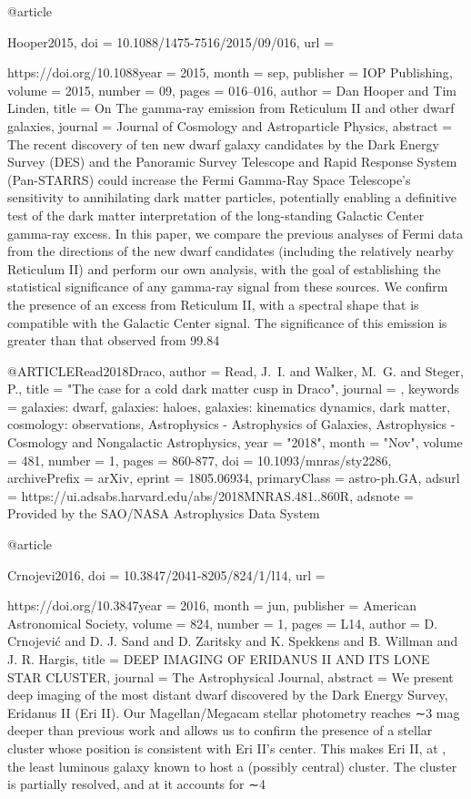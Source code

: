 \documentclass[apj]{emulateapj}
\begin{document}
{{{{@article{Hooper2015,
	doi = {10.1088/1475-7516/2015/09/016},
	url = {https://doi.org/10.1088year = 2015,
	month = {sep},
	publisher = {{IOP} Publishing},
	volume = {2015},
	number = {09},
	pages = {016--016},
	author = {Dan Hooper and Tim Linden},
	title = {On The gamma-ray emission from Reticulum {II} and other dwarf galaxies},
	journal = {Journal of Cosmology and Astroparticle Physics},
	abstract = {The recent discovery of ten new dwarf galaxy candidates by the Dark Energy Survey (DES) and the Panoramic Survey Telescope and Rapid Response System (Pan-STARRS) could increase the Fermi Gamma-Ray Space Telescope's sensitivity to annihilating dark matter particles, potentially enabling a definitive test of the dark matter interpretation of the long-standing Galactic Center gamma-ray excess. In this paper, we compare the previous analyses of Fermi data from the directions of the new dwarf candidates (including the relatively nearby Reticulum II) and perform our own analysis, with the goal of establishing the statistical significance of any gamma-ray signal from these sources. We confirm the presence of an excess from Reticulum II, with a spectral shape that is compatible with the Galactic Center signal. The significance of this emission is greater than that observed from 99.84}

@ARTICLE{Read2018Draco,
       author = {{Read}, J.~I. and {Walker}, M.~G. and {Steger}, P.},
        title = "{The case for a cold dark matter cusp in Draco}",
      journal = {\mnras},
     keywords = {galaxies: dwarf, galaxies: haloes, galaxies: kinematics dynamics, dark matter, cosmology: observations, Astrophysics - Astrophysics of Galaxies, Astrophysics - Cosmology and Nongalactic Astrophysics},
         year = "2018",
        month = "Nov",
       volume = {481},
       number = {1},
        pages = {860-877},
          doi = {10.1093/mnras/sty2286},
archivePrefix = {arXiv},
       eprint = {1805.06934},
 primaryClass = {astro-ph.GA},
       adsurl = {https://ui.adsabs.harvard.edu/abs/2018MNRAS.481..860R},
      adsnote = {Provided by the SAO/NASA Astrophysics Data System}
}



@article{Crnojevi2016,
	doi = {10.3847/2041-8205/824/1/l14},
	url = {https://doi.org/10.3847year = 2016,
	month = {jun},
	publisher = {American Astronomical Society},
	volume = {824},
	number = {1},
	pages = {L14},
	author = {D. Crnojevi{\'{c}} and D. J. Sand and D. Zaritsky and K. Spekkens and B. Willman and J. R. Hargis},
	title = {{DEEP} {IMAGING} {OF} {ERIDANUS} {II} {AND} {ITS} {LONE} {STAR} {CLUSTER}},
	journal = {The Astrophysical Journal},
	abstract = {We present deep imaging of the most distant dwarf discovered by the Dark Energy Survey, Eridanus II (Eri II). Our Magellan/Megacam stellar photometry reaches ∼3 mag deeper than previous work and allows us to confirm the presence of a stellar cluster whose position is consistent with Eri II’s center. This makes Eri II, at , the least luminous galaxy known to host a (possibly central) cluster. The cluster is partially resolved, and at  it accounts for ∼4}


}}}}}}}}
\end{document}
